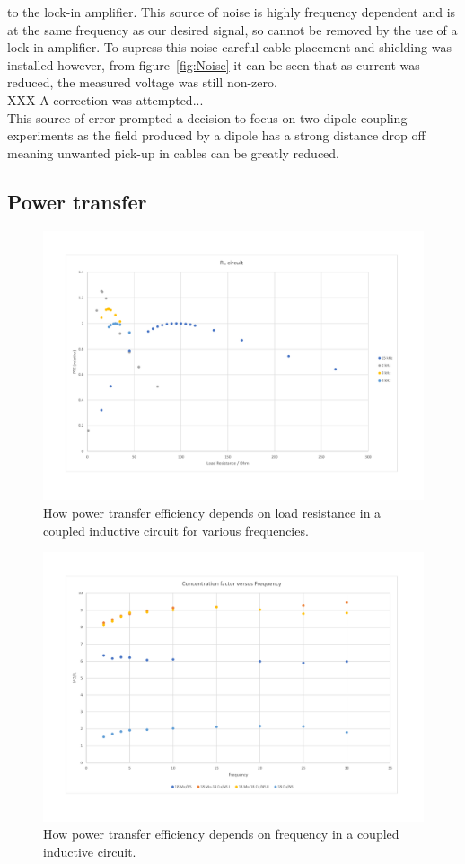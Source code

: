 \documentclass[11pt]{iopart}
\begin{document}
to the lock-in amplifier. This source of noise is highly frequency
dependent and is at the same frequency as our desired signal, so
cannot be removed by the use of a lock-in amplifier. To supress this
noise careful cable placement and shielding was installed however,
from figure~\ref{fig:Noise} it can be seen that as current was
reduced, the measured voltage was still non-zero.\\ XXX A correction
was attempted...\\
This source of error prompted a decision to focus on two dipole
coupling experiments as the field produced by a dipole has a strong
distance drop off meaning unwanted pick-up in cables can be greatly
reduced.\\

\subsection{Power transfer}

\begin{figure}
  \begin{center}
   \noindent\includegraphics[width=0.75\linewidth]{images/RL-R.pdf}
  \end{center}
  \caption{How power transfer efficiency depends on load resistance in
    a coupled inductive circuit for various
    frequencies. \label{fig:RL-R}}
\end{figure}

\begin{figure}
  \begin{center}
   \noindent\includegraphics[width=0.75\linewidth]{images/RL-F.pdf}
  \end{center}
  \caption{How power transfer efficiency depends on frequency in a
    coupled inductive circuit.}\label{fig:RL-F}
\end{figure}
\end{document}
